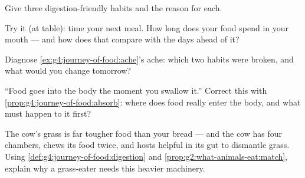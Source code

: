 \begin{exercise}[$\star$]\label{exo:g4:journey-of-food:7}
Give three digestion-friendly habits and the reason for each.
\end{exercise}

\begin{exercise}[$\star$]\label{exo:g4:journey-of-food:8}
Try it (at table): time your next meal. How long does your
food spend in your mouth --- and how does that compare with
the days ahead of it?
\end{exercise}

\begin{exercise}[$\star\star$]\label{exo:g4:journey-of-food:9}
Diagnose \cref{ex:g4:journey-of-food:ache}'s  ache:
which two habits were broken, and what would you change
tomorrow?
\end{exercise}

\begin{exercise}[$\star\star$]\label{exo:g4:journey-of-food:10}
``Food goes into the body the moment you swallow it.''
Correct this with \cref{prop:g4:journey-of-food:absorb}:
where does food really enter the body, and what must happen
to it first?
\end{exercise}

\begin{exercise}[$\star\star\star$]\label{exo:g4:journey-of-food:11}
The cow's grass is far tougher food than your bread --- and
the cow has four  chambers, chews its food twice, and
hosts helpful  in its gut to dismantle grass.
Using \cref{def:g4:journey-of-food:digestion} and
\cref{prop:g2:what-animals-eat:match}, explain why a
grass-eater needs this heavier machinery.
\end{exercise}
